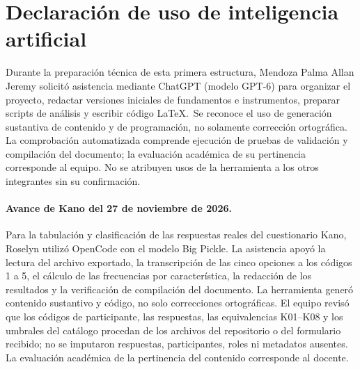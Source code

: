 \section{Declaración de uso de inteligencia artificial}
Durante la preparación técnica de esta primera estructura, Mendoza Palma Allan Jeremy solicitó asistencia mediante ChatGPT (modelo GPT-6) para organizar el proyecto, redactar versiones iniciales de fundamentos e instrumentos, preparar scripts de análisis y escribir código \LaTeX.\ Se reconoce el uso de generación sustantiva de contenido y de programación, no solamente corrección ortográfica. La comprobación automatizada comprende ejecución de pruebas de validación y compilación del documento; la evaluación académica de su pertinencia corresponde al equipo. No se atribuyen usos de la herramienta a los otros integrantes sin su confirmación.

\paragraph{Avance de Kano del 27 de noviembre de 2026.}
Para la tabulación y clasificación de las respuestas reales del cuestionario Kano, Roselyn utilizó OpenCode con el modelo Big Pickle. La asistencia apoyó la lectura del archivo exportado, la transcripción de las cinco opciones a los códigos 1 a 5, el cálculo de las frecuencias por característica, la redacción de los resultados y la verificación de compilación del documento. La herramienta generó contenido sustantivo y código, no solo correcciones ortográficas. El equipo revisó que los códigos de participante, las respuestas, las equivalencias K01--K08 y los umbrales del catálogo procedan de los archivos del repositorio o del formulario recibido; no se imputaron respuestas, participantes, roles ni metadatos ausentes. La evaluación académica de la pertinencia del contenido corresponde al docente.
